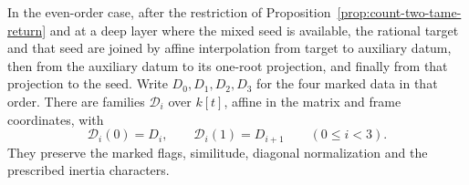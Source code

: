 \begin{proposition}\label{prop:count-two-three-lines}
In the even-order case, after the restriction of
Proposition~\ref{prop:count-two-tame-return} and at a deep layer
where the mixed seed is available, the rational target and that
seed are joined by affine interpolation from target to auxiliary datum,
then from the auxiliary datum to its one-root projection, and finally
from that projection to the seed. Write \(D_0,D_1,D_2,D_3\) for the four marked data in that order.
There are families \(\mathcal D_i\) over \(k[t]\), affine in the matrix
and frame coordinates, with
\[
           \mathcal D_i(0)=D_i,\qquad \mathcal D_i(1)=D_{i+1}
                         \qquad(0\le i<3).
\]
They preserve the marked flags, similitude,
diagonal normalization and the prescribed inertia characters.
\end{proposition}

